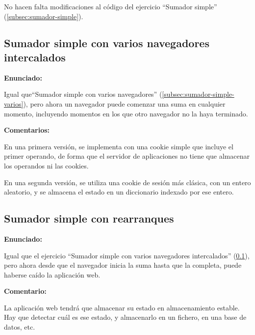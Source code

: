 No hacen falta modificaciones al código del ejercicio ``Sumador simple'' (\ref{subsec:sumador-simple}).


\subsection{Sumador simple con varios navegadores intercalados}
\label{subsec:sumador-simple-varios-intercalados}

\textbf{Enunciado:}

Igual que``Sumador simple con varios navegadores'' (\ref{subsec:sumador-simple-varios}), pero ahora un navegador puede comenzar una suma en cualquier momento, incluyendo momentos en los que otro navegador no la haya terminado.

\textbf{Comentarios:}

En una primera versión, se implementa con una cookie simple que incluye el primer operando, de forma que el servidor de aplicaciones no tiene que almacenar los operandos ni las cookies.

En una segunda versión, se utiliza una cookie de sesión más clásica, con un entero aleatorio, y se almacena el estado en un diccionario indexado por ese entero.

\subsection{Sumador simple con rearranques}
\label{subsec:sumador-simple-rearranques}

\textbf{Enunciado:}

Igual que el ejercicio ``Sumador simple con varios navegadores intercalados'' (\ref{subsec:sumador-simple-varios-intercalados}), pero ahora desde que el navegador inicia la suma hasta que la completa, puede haberse caído la aplicación web.

\textbf{Comentario:}

La aplicación web tendrá que  almacenar su estado en almacenamiento estable. Hay que detectar cuál es ese estado, y almacenarlo en  un fichero, en  una base de datos, etc.


